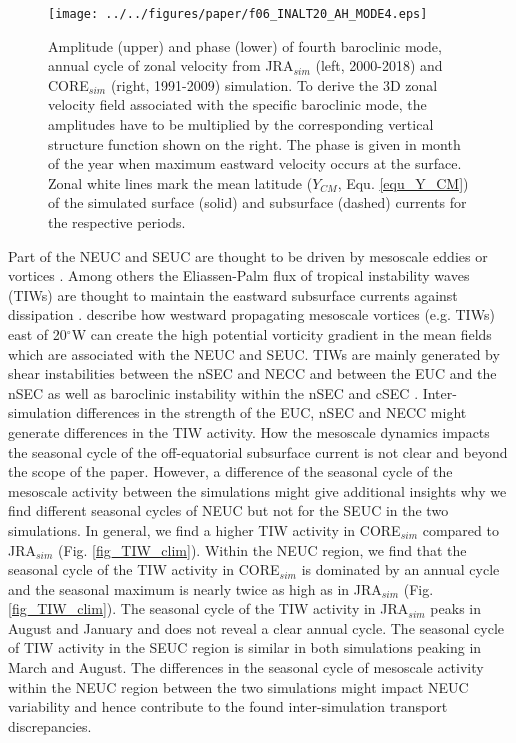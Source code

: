 \documentclass[os, manuscript]{copernicus}
\begin{document}
\begin{figure}[t]
	\texttt{[image: ../../figures/paper/f06\_INALT20\_AH\_MODE4.eps]}
	\caption{Amplitude (upper) and phase (lower) of fourth baroclinic mode, annual cycle of zonal velocity from JRA$_{sim}$ (left, 2000-2018) and CORE$_{sim}$ (right, 1991-2009) simulation. To derive the 3D zonal velocity field associated with the specific baroclinic mode, the amplitudes have to be multiplied by the corresponding vertical structure function shown on the right. The phase is given in month of the year when maximum eastward velocity occurs at the surface. Zonal white lines mark the mean latitude ($ Y_{CM} $, Equ. \ref{equ_Y_CM}) of the simulated surface (solid) and subsurface (dashed) currents for the respective periods.}
	\label{fig_MODE4_AH}
\end{figure}

Part of the NEUC and SEUC are thought to be driven by mesoscale eddies or vortices \citep[e.g. ][]{Jochum2004b,Assene2020}. Among others the Eliassen-Palm flux of tropical instability waves (TIWs) are thought to maintain the eastward subsurface currents against dissipation \citep{Jochum2004b}. \cite{Assene2020} describe how westward propagating mesoscale vortices (e.g. TIWs) east of 20$^{\circ}$W can create the high potential vorticity gradient in the mean fields which are associated with the NEUC and SEUC. TIWs are mainly generated by shear instabilities between the nSEC and NECC \citep{Philander1978,Athie2008} and between the EUC and the nSEC as well as baroclinic instability within the nSEC and cSEC \citep{Weisberg1988,Jochum2004}. Inter-simulation differences in the strength of the EUC, nSEC and NECC might generate differences in the TIW activity. How the mesoscale dynamics impacts the seasonal cycle of the off-equatorial subsurface current is not clear and beyond the scope of the paper. However, a difference of the seasonal cycle of the mesoscale activity between the simulations might give additional insights why we find different seasonal cycles of NEUC but not for the SEUC in the two simulations. In general, we find a higher TIW activity in CORE$_{sim}$ compared to JRA$_{sim}$ (Fig. \ref{fig_TIW_clim}). Within the NEUC region, we find that the seasonal cycle of the TIW activity in CORE$_{sim}$ is dominated by an annual cycle and the seasonal maximum is nearly twice as high as in JRA$_{sim}$ (Fig. \ref{fig_TIW_clim}). The seasonal cycle of the TIW activity in JRA$_{sim}$ peaks in August and January and does not reveal a clear annual cycle. The seasonal cycle of TIW activity in the SEUC region is similar in both simulations peaking in March and August. The differences in the seasonal cycle of mesoscale activity within the NEUC region between the two simulations might impact NEUC variability and hence contribute to the found inter-simulation transport discrepancies. 
\end{document}
